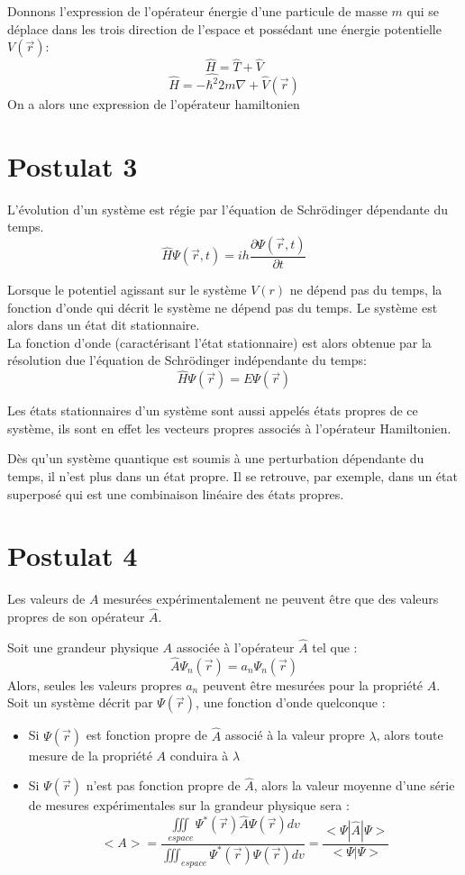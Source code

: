 \documentclass[../main.tex]{subfile}
\begin{document}
\begin{ex}
	Donnons l'expression de l'opérateur énergie d'une particule de masse $m$ qui se déplace dans les trois direction de l'espace et possédant une énergie potentielle $V(\vec{r})$:
	$$\hat{H} = \hat{T} + \hat{V}$$
	$$\hat{H} = -\hat{\hbar^2}{2m}\nabla + \hat{V}(\vec{r})$$
	On a alors une expression de l'opérateur hamiltonien
\end{ex}



\section{Postulat 3}

L'évolution d'un système est régie par l'équation de Schrödinger dépendante du temps.
$$\hat{H} \Psi(\vec{r}, t) = ih\frac{\partial \Psi(\vec{r}, t)}{\partial t}$$

Lorsque le potentiel agissant sur le système $V(r)$ ne dépend pas du temps, la fonction d'onde qui décrit le système ne dépend pas du temps. Le système est alors dans un état dit stationnaire.\\
La fonction d'onde (caractérisant l'état stationnaire) est alors obtenue par la résolution due l'équation de Schrödinger indépendante du temps:
$$\hat{H} \Psi(\vec{r}) = E\Psi(\vec{r})$$

Les états stationnaires d'un système sont aussi appelés états propres de ce système, ils sont en effet les vecteurs propres associés à l'opérateur Hamiltonien.

Dès qu'un système quantique est soumis à une perturbation dépendante du temps, il n'est plus dans un état propre. Il se retrouve, par exemple, dans un état superposé qui est une combinaison linéaire des états propres.

\section{Postulat 4}
Les valeurs de $A$ mesurées expérimentalement ne peuvent être que des valeurs propres de son opérateur $\hat{A}$.

Soit une grandeur physique $A$ associée à l'opérateur $\hat{A}$ tel que :
$$\hat{A} \Psi_n(\vec{r}) = a_n\Psi_n(\vec{r})$$
Alors, seules les valeurs propres $a_n$ peuvent être mesurées pour la propriété $A$.\\

Soit un système décrit par $\Psi(\vec{r})$, une fonction d'onde quelconque : \\
\begin{itemize}
	\item Si $\Psi(\vec{r})$ est fonction propre de $\hat{A}$ associé à la valeur propre $\lambda$, alors toute mesure de la propriété $A$ conduira à $\lambda$
	\item Si $\Psi(\vec{r})$ n'est pas fonction propre de $\hat{A}$, alors la valeur moyenne d'une série de mesures expérimentales sur la grandeur physique sera :
	$$<A> = \frac{\iiint\limits_{espace} \Psi^*(\vec{r})\hat{A}\Psi(\vec{r})dv}{\iiint_{espace} \Psi^*(\vec{r}) \Psi(\vec{r}) dv} = \frac{<\Psi | \hat{A} | \Psi >}{<\Psi | \Psi>}$$
\end{itemize}
\end{document}
